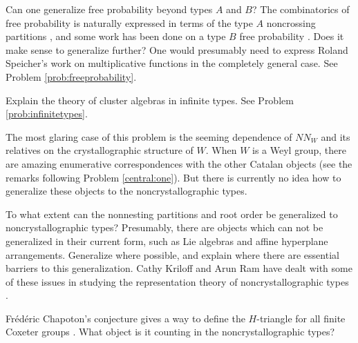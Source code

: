 \documentclass[12pt,letterpaper, reqno]{aimpl}
\begin{document}
\begin{problemblock}
\begin{remark}
Can one generalize free probability beyond types $A$ and $B$? The combinatorics of free probability is naturally expressed in terms of the type $A$ noncrossing partitions \cite{speicher:survey}, and some work has been done on a type $B$ free probability \cite{biane-goodman-nica}. Does it make sense to generalize further? One would presumably need to express Roland Speicher's work on multiplicative functions \cite{speicher} in the completely general case. See Problem \ref{prob:freeprobability}.
\end{remark}

\begin{remark}
Explain the theory of cluster algebras in infinite types. See Problem \ref{prob:infinitetypes}.
\end{remark}

\begin{remark}
 The most glaring case of this problem is the seeming dependence of $NN_W$ and its relatives on the crystallographic structure of $W$. When $W$ is a Weyl group, there are amazing enumerative correspondences with the other Catalan objects (see the remarks following Problem \ref{central:one}). But there is currently no idea how to generalize these objects to the noncrystallographic types.

To what extent can the nonnesting partitions and root order be generalized to noncrystallographic types? Presumably, there are objects which can not be generalized in their current form, such as Lie algebras and affine hyperplane arrangements. Generalize where possible, and explain where there are essential barriers to this generalization. Cathy Kriloff and Arun Ram have dealt with some of these issues in studying the representation theory of noncrystallographic types \cite{kriloff-ram}.

Fr\'ed\'eric Chapoton's conjecture gives a way to define the $H$-triangle for all finite Coxeter groups \cite{chapoton:two}. What object is it counting in the noncrystallographic types?
\end{remark}

\end{problemblock}
\end{document}
